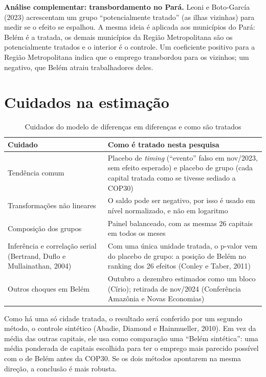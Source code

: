 \documentclass[12pt,a4paper]{article}
\begin{document}
\textbf{Análise complementar: transbordamento no Pará.} Leoni e Boto-García (2023) acrescentam um grupo
``potencialmente tratado'' (as ilhas vizinhas) para medir se o efeito se espalhou. A mesma ideia é
aplicada aos municípios do Pará: Belém é a tratada, os demais municípios da Região Metropolitana são os
potencialmente tratados e o interior é o controle. Um coeficiente positivo para a Região Metropolitana
indica que o emprego transbordou para os vizinhos; um negativo, que Belém atraiu trabalhadores deles.

\section{Cuidados na estimação}

\begin{table}[H]
\centering\small
\caption{Cuidados do modelo de diferenças em diferenças e como são tratados}
\begin{tabularx}{\linewidth}{p{4.2cm}L}
\toprule
\textbf{Cuidado} & \textbf{Como é tratado nesta pesquisa}\\
\midrule
Tendência comum & Placebo de \textit{timing} (``evento'' falso em nov/2023, sem efeito esperado) e placebo de grupo (cada capital tratada como se tivesse sediado a COP30)\\
Transformações não lineares & O saldo pode ser negativo, por isso é usado em nível normalizado, e não em logaritmo\\
Composição dos grupos & Painel balanceado, com as mesmas 26 capitais em todos os meses\\
Inferência e correlação serial (Bertrand, Duflo e Mullainathan, 2004) & Com uma única unidade tratada, o p-valor vem do placebo de grupo: a posição de Belém no ranking dos 26 efeitos (Conley e Taber, 2011)\\
Outros choques em Belém & Outubro a dezembro estimados como um bloco (Círio); retirada de nov/2024 (Conferência Amazônia e Novas Economias)\\
\bottomrule
\end{tabularx}
\end{table}

Como há uma só cidade tratada, o resultado será conferido por um segundo método, o controle sintético
(Abadie, Diamond e Hainmueller, 2010). Em vez da média das outras capitais, ele usa como comparação uma
``Belém sintética'': uma média ponderada de capitais escolhida para ter o emprego mais parecido possível
com o de Belém antes da COP30. Se os dois métodos apontarem na mesma direção, a conclusão é mais robusta.
\end{document}
